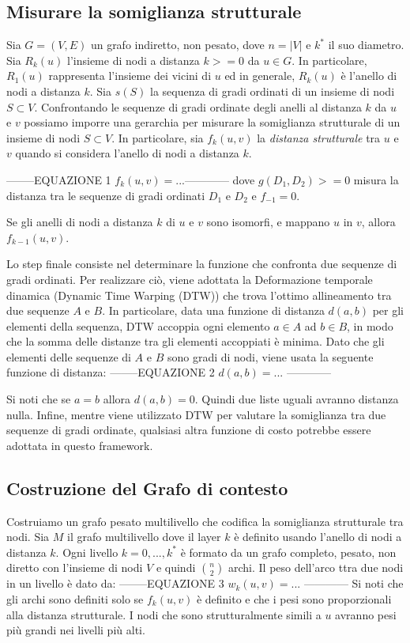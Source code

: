\documentclass[11pt]{article}
\begin{document}
\subsection{Misurare la somiglianza strutturale}
Sia $G=(V,E)$ un grafo indiretto, non pesato, dove $n=|V|$ e $k^*$ il suo diametro.
Sia $R_k(u)$ l'insieme di nodi a distanza $k>=0$ da $u\in G$. In particolare, $R_1(u)$ rappresenta l'insieme dei vicini di $u$ ed in generale, $R_k(u)$ è l'anello di nodi a distanza $k$.
Sia $s(S)$ la sequenza di gradi ordinati di un insieme di nodi $S\subset V$.
Confrontando le sequenze di gradi ordinate degli anelli al distanza $k$ da $u$ e $v$ possiamo imporre una gerarchia per misurare la somiglianza strutturale di un insieme di nodi $S\subset V$.
In particolare, sia $f_k(u,v)$ la \textit{distanza strutturale} tra $u$ e $v$ quando si considera l'anello di nodi a distanza $k$.

--------EQUAZIONE 1 $f_k(u,v)=...$------------
dove $g(D_1,D_2)>=0$ misura la distanza tra le sequenze di gradi ordinati $D_1$ e $D_2$ e $f_{-1}=0$.

Se gli anelli di nodi a distanza $k$ di $u$ e $v$ sono isomorfi, e mappano $u$ in $v$, allora $f_{k-1}(u,v)$.

Lo step finale consiste nel determinare la funzione che confronta due sequenze di gradi ordinati.
Per realizzare ciò, viene adottata la Deformazione temporale dinamica (Dynamic Time Warping (DTW)) che trova l'ottimo allineamento tra due sequenze $A$ e $B$. In particolare, data una funzione di distanza $d(a,b)$ per gli elementi della sequenza, DTW accoppia ogni elemento $a\in A$ ad $b\in B$, in modo che la somma delle distanze tra gli elementi accoppiati è minima. Dato che gli elementi delle sequenze di $A$ e $B$ sono gradi di nodi, viene usata la seguente funzione di distanza:
--------EQUAZIONE 2 $d(a,b)=...$ ------------

Si noti che se $a=b$ allora $d(a,b)=0$. Quindi due liste uguali avranno distanza nulla.
Infine, mentre viene utilizzato DTW per valutare la somiglianza tra due sequenze di gradi ordinate, qualsiasi altra funzione di costo potrebbe essere adottata in questo framework.

\subsection{Costruzione del Grafo di contesto}
Costruiamo un grafo pesato multilivello che codifica la somiglianza strutturale tra nodi.
Sia $M$ il grafo multilivello dove il layer $k$ è definito usando l'anello di nodi a distanza $k$.
Ogni livello $k=0,...,k^*$ è formato da un grafo completo, pesato, non diretto con l'insieme di nodi $V$ e quindi $\binom{n}{2}$ archi. Il peso dell'arco ttra due nodi in un livello è dato da:
--------EQUAZIONE 3 $w_k(u,v)=...$ ------------
Si noti che gli archi sono definiti solo se $f_k(u,v)$ è definito e che i pesi sono proporzionali alla distanza strutturale.
I nodi che sono strutturalmente simili a $u$ avranno pesi più grandi nei livelli più alti.
\end{document}
